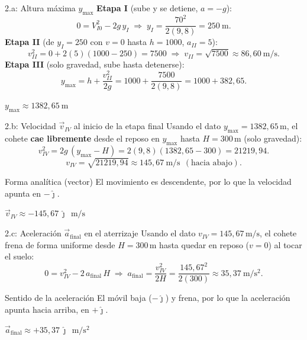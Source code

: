 \documentclass[letterpaper, 11pt]{article}
\begin{document}
\begin{paso}{2.a: Altura m\'axima $y_{\max}$}
\textbf{Etapa I} (sube y se detiene, $a=-g$):
\[
0=V_{I0}^2-2g\,y_I \;\Rightarrow\; y_I=\frac{70^2}{2(9{,}8)}=250\ \mathrm{m}.
\]
\textbf{Etapa II} (de $y_I=250$ con $v=0$ hasta $h=1000$, $a_{II}=5$):
\[
v_{II}^2=0+2(5)(1000-250)=7500 \;\Rightarrow\; v_{II}=\sqrt{7500}\approx 86{,}60\ \mathrm{m/s}.
\]
\textbf{Etapa III} (solo gravedad, sube hasta detenerse):
\[
y_{\max}=h+\frac{v_{II}^2}{2g}=1000+\frac{7500}{2(9{,}8)}=1000+382{,}65 .
\]
\begin{resultado}\centering
$\displaystyle y_{\max}\approx 1382{,}65\ \mathrm{m}$
\end{resultado}
\end{paso}

\begin{paso}{2.b: Velocidad $\vec{v}_{IV}$ al inicio de la etapa final}
Usando el dato $y_{\max}=1382{,}65\,\mathrm{m}$, el cohete \textbf{cae libremente}
desde el reposo en $y_{\max}$ hasta $H=300\,\mathrm{m}$ (solo gravedad):
\[
v_{IV}^2=2g\,(y_{\max}-H)=2(9{,}8)(1382{,}65-300)=21219{,}94 .
\]
\[
v_{IV}=\sqrt{21219{,}94}\approx 145{,}67\ \mathrm{m/s}\ \ (\text{hacia abajo}).
\]
\begin{justif}{Forma anal\'itica (vector)}
El movimiento es descendente, por lo que la velocidad apunta en $-\hat{\jmath}$.
\end{justif}
\begin{resultado}\centering
$\displaystyle \vec{v}_{IV}\approx -145{,}67\,\hat{\jmath}\ \ \mathrm{m/s}$
\end{resultado}
\end{paso}

\begin{paso}{2.c: Aceleraci\'on $\vec{a}_{\mathrm{final}}$ en el aterrizaje}
Usando el dato $v_{IV}=145{,}67\,\mathrm{m/s}$, el cohete frena de forma uniforme
desde $H=300\,\mathrm{m}$ hasta quedar en reposo ($v=0$) al tocar el suelo:
\[
0=v_{IV}^2-2\,a_{\mathrm{final}}\,H
\;\Rightarrow\;
a_{\mathrm{final}}=\frac{v_{IV}^2}{2H}=\frac{145{,}67^2}{2(300)}\approx 35{,}37\ \mathrm{m/s^2}.
\]
\begin{justif}{Sentido de la aceleraci\'on}
El m\'ovil baja ($-\hat{\jmath}$) y frena, por lo que la aceleraci\'on apunta hacia
arriba, en $+\hat{\jmath}$.
\end{justif}
\begin{resultado}\centering
$\displaystyle \vec{a}_{\mathrm{final}}\approx +35{,}37\,\hat{\jmath}\ \ \mathrm{m/s^2}$
\end{resultado}
\end{paso}
\end{document}

